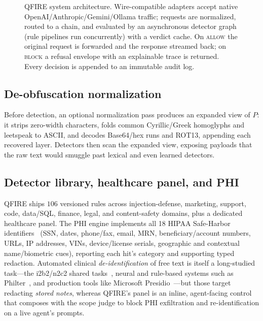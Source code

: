 \documentclass[11pt]{article}
\begin{document}
\begin{figure}[p]
{%
}
\caption{QFIRE system architecture. Wire-compatible adapters accept native
OpenAI/Anthropic/Gemini/Ollama traffic; requests are normalized, routed to a chain,
and evaluated by an asynchronous detector graph (rule pipelines run concurrently)
with a verdict cache. On \textsc{allow} the original request is forwarded and the
response streamed back; on \textsc{block} a refusal envelope with an explainable
trace is returned. Every decision is appended to an immutable audit log.}
\label{fig:arch}
\end{figure}

\subsection{De-obfuscation normalization}
Before detection, an optional normalization pass produces an expanded view of $P$:
it strips zero-width characters, folds common Cyrillic/Greek homoglyphs and
leetspeak to ASCII, and decodes Base64/hex runs and ROT13, appending each
recovered layer. Detectors then scan the expanded view, exposing payloads that
the raw text would smuggle past lexical and even learned detectors.

\subsection{Detector library, healthcare panel, and PHI}
QFIRE ships $106$ versioned rules across injection-defense, marketing,
support, code, data/SQL, finance, legal, and content-safety domains, plus a
dedicated healthcare panel. The PHI engine implements all 18 HIPAA Safe-Harbor
identifiers~\cite{hipaa_safe_harbor} (SSN, dates, phone/fax, email, MRN,
beneficiary/account numbers, URLs, IP addresses, VINs, device/license serials,
geographic and contextual name/biometric cues), reporting each hit's category and
supporting typed redaction. Automated clinical \emph{de-identification} of free text is
itself a long-studied task---the i2b2/n2c2 shared tasks~\cite{i2b2deid2015}, neural and
rule-based systems such as Philter~\cite{philter2020}, and production tools like
Microsoft Presidio~\cite{presidio}---but those target redacting \emph{stored notes},
whereas QFIRE's panel is an inline, agent-facing control that composes with the scope
judge to block PHI exfiltration and re-identification on a live agent's prompts.
\end{document}
